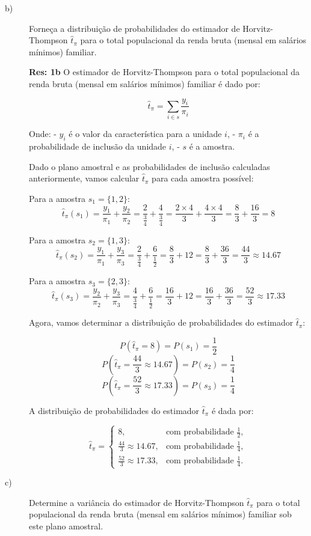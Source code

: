 \documentclass[a4paper,11pt,oneside,twocolumn]{Config/milktest}
\begin{document}
\begin{description}
\item[b)] Forneça a distribuição de probabilidades do estimador de Horvitz-Thompson $\hat{t}_\pi$ para o total populacional da renda bruta (mensal em salários mínimos) familiar.

\medskip
{\scriptsize

\textbf{Res:  1b} O estimador de Horvitz-Thompson para o total populacional da renda bruta (mensal em salários mínimos) familiar é dado por:

\[
\hat{t}_\pi = \sum_{i \in s} \frac{y_i}{\pi_i}
\]

Onde:
- \(y_i\) é o valor da característica para a unidade \(i\),
- \(\pi_i\) é a probabilidade de inclusão da unidade \(i\),
- \(s\) é a amostra.

Dado o plano amostral e as probabilidades de inclusão calculadas anteriormente, vamos calcular \(\hat{t}_\pi\) para cada amostra possível:

Para a amostra \(s_1 = \{1, 2\}\):
\[
\hat{t}_\pi(s_1) = \frac{y_1}{\pi_1} + \frac{y_2}{\pi_2} = \frac{2}{\frac{3}{4}} + \frac{4}{\frac{3}{4}} = \frac{2 \times 4}{3} + \frac{4 \times 4}{3} = \frac{8}{3} + \frac{16}{3} = 8
\]

Para a amostra \(s_2 = \{1, 3\}\):
\[
\hat{t}_\pi(s_2) = \frac{y_1}{\pi_1} + \frac{y_3}{\pi_3} = \frac{2}{\frac{3}{4}} + \frac{6}{\frac{1}{2}} = \frac{8}{3} + 12 = \frac{8}{3} + \frac{36}{3} = \frac{44}{3} \approx 14.67
\]

Para a amostra \(s_3 = \{2, 3\}\):
\[
\hat{t}_\pi(s_3) = \frac{y_2}{\pi_2} + \frac{y_3}{\pi_3} = \frac{4}{\frac{3}{4}} + \frac{6}{\frac{1}{2}} = \frac{16}{3} + 12 = \frac{16}{3} + \frac{36}{3} = \frac{52}{3} \approx 17.33
\]

Agora, vamos determinar a distribuição de probabilidades do estimador \(\hat{t}_\pi\):

\[
P\left(\hat{t}_\pi = 8\right) = P(s_1) = \frac{1}{2}
\]
\[
P\left(\hat{t}_\pi = \frac{44}{3} \approx 14.67\right) = P(s_2) = \frac{1}{4}
\]
\[
P\left(\hat{t}_\pi = \frac{52}{3} \approx 17.33\right) = P(s_3) = \frac{1}{4}
\]

A distribuição de probabilidades do estimador \(\hat{t}_\pi\) é dada por:

\[
\hat{t}_\pi =
\begin{cases}
8, & \text{com probabilidade } \frac{1}{2}, \\
\frac{44}{3} \approx 14.67, & \text{com probabilidade } \frac{1}{4}, \\
\frac{52}{3} \approx 17.33, & \text{com probabilidade } \frac{1}{4}.
\end{cases}
\]
}
\item[c)] Determine a variância do estimador de Horvitz-Thompson $\hat{t}_\pi$ para o total populacional da renda bruta (mensal em salários mínimos) familiar sob este plano amostral.
\end{description}
\end{document}
